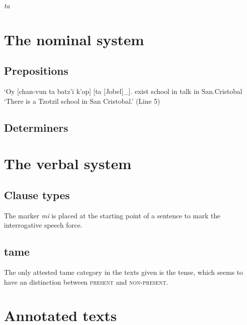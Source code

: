 \documentclass[12pt]{article}
\newcommand*{\form}[1]{\emph{#1}}
\newcommand{\translate}[1]{`#1'}
\newcommand{\category}[1]{\textsc{#1}}
\def\\{}%
\begin{document}
\form{ta}

\section{The nominal system}

\subsection{Prepositions}

\begin{exe}
    \ex\label{ex:nominal.preposition.1} \gll `Oy [chan-vun ta batz'i k'op] [ta [Jobel]_{}]. \\
    exist school in {} talk in San.Cristobal \\
    \glt \translate{There is a Tzotzil school in San Cristobal.} (Line 5)
    \ex 
\end{exe}

\subsection{Determiners}



\section{The verbal system}

\subsection{Clause types}

The marker \form{mi} is placed at the starting point of a sentence to mark the interrogative speech force.

\subsection{\ac{tame}}

The only attested \ac{tame} category in the texts given is the tense,
which seems to have an distinction between \category{present} and \category{non-present}.

\section{Annotated texts}
\end{document}
